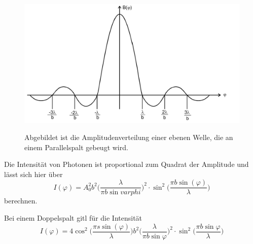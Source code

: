  \begin{figure}[H]
    \centering
    \caption{Abgebildet ist die Amplitudenverteilung einer ebenen Welle, die an einem Parallelspalt gebeugt wird.}
    \includegraphics{Bilder/Amplitude.png}
    \label{fig:Amplitude}
\end{figure}

Die Intensität von Photonen ist proportional zum Quadrat der Amplitude und lässt sich hier über 
\begin{equation}
    I(\varphi)=A_0^2 b^2 \biggl( \frac{\lambda}{\pi b \sin{varphi}}\biggr)^2 \cdot \sin^2 \biggl( \frac{\pi b \sin(\varphi)}{\lambda}\biggr)
    \label{fig:Intensität}
\end{equation}
berechnen.

Bei einem Doppelspalt gitl für die Intensität
\begin{equation}
    I(\varphi)=4 \cos^2 \biggl( \frac{\pi s \sin(\varphi)}{\lambda} \biggr) b^2 \biggl( \frac{\lambda}{\pi b \sin \varphi}\biggr)^2 \cdot \sin^2 \biggl( \frac{\pi b \sin \varphi}{\lambda}\biggr)
    \label{fig:Intensität2}
\end{equation}